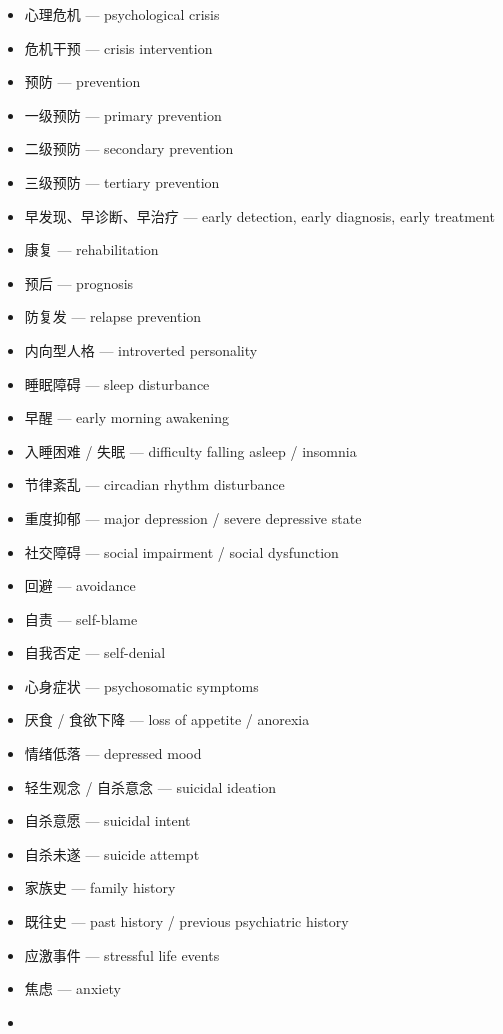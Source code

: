 \documentclass[
  chinese,
  9pt,
  a4paper,
]{ctexart}
\providecommand{\tightlist}{%
  \setlength{\itemsep}{0pt}\setlength{\parskip}{0pt}}
\begin{document}
\begin{itemize}
\tightlist
\item
  心理危机 --- psychological crisis
\item
  危机干预 --- crisis intervention
\item
  预防 --- prevention
\item
  一级预防 --- primary prevention
\item
  二级预防 --- secondary prevention
\item
  三级预防 --- tertiary prevention
\item
  早发现、早诊断、早治疗 --- early detection, early diagnosis, early
  treatment
\item
  康复 --- rehabilitation
\item
  预后 --- prognosis
\item
  防复发 --- relapse prevention
\item
  内向型人格 --- introverted personality
\item
  睡眠障碍 --- sleep disturbance
\item
  早醒 --- early morning awakening
\item
  入睡困难 / 失眠 --- difficulty falling asleep / insomnia
\item
  节律紊乱 --- circadian rhythm disturbance
\item
  重度抑郁 --- major depression / severe depressive state
\item
  社交障碍 --- social impairment / social dysfunction
\item
  回避 --- avoidance
\item
  自责 --- self-blame
\item
  自我否定 --- self-denial
\item
  心身症状 --- psychosomatic symptoms
\item
  厌食 / 食欲下降 --- loss of appetite / anorexia
\item
  情绪低落 --- depressed mood
\item
  轻生观念 / 自杀意念 --- suicidal ideation
\item
  自杀意愿 --- suicidal intent
\item
  自杀未遂 --- suicide attempt
\item
  家族史 --- family history
\item
  既往史 --- past history / previous psychiatric history
\item
  应激事件 --- stressful life events
\item
  焦虑 --- anxiety
\item

\end{itemize}
\end{document}
